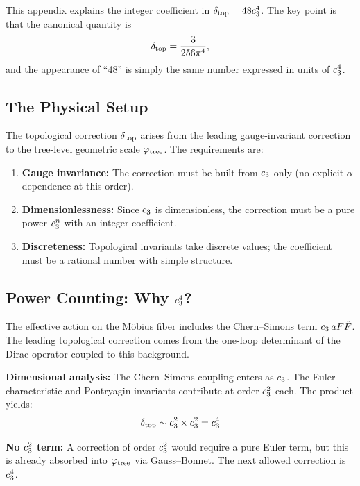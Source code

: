 This appendix explains the integer coefficient in $\delta_{\mathrm{top}} = 48c_3^4$.
The key point is that the canonical quantity is
\begin{equation}
    \delta_{\mathrm{top}} = \frac{3}{256\pi^4},
\end{equation}
and the appearance of ``48'' is simply the same number expressed in units of $c_3^4$.

\subsection{The Physical Setup}

The topological correction $\delta_{\mathrm{top}}$ arises from the leading gauge-invariant correction 
to the tree-level geometric scale $\varphi_{\mathrm{tree}}$. The requirements are:
\begin{enumerate}[leftmargin=1.5em, topsep=2pt, itemsep=1pt]
    \item \textbf{Gauge invariance:} The correction must be built from $c_3$ only 
        (no explicit $\alpha$ dependence at this order).
    \item \textbf{Dimensionlessness:} Since $c_3$ is dimensionless, the correction 
        must be a pure power $c_3^n$ with an integer coefficient.
    \item \textbf{Discreteness:} Topological invariants take discrete values; the 
        coefficient must be a rational number with simple structure.
\end{enumerate}

\subsection{\texorpdfstring{Power Counting: Why $c_3^4$?}{Power Counting: Why c3^4?}}

The effective action on the M\"obius fiber includes the Chern--Simons term 
$c_3\, a F\tilde{F}$. The leading topological correction comes from the 
one-loop determinant of the Dirac operator coupled to this background.

\textbf{Dimensional analysis:} The Chern--Simons coupling enters as $c_3$. The 
Euler characteristic and Pontryagin invariants contribute at order $c_3^2$ each. 
The product yields:
\begin{equation}
    \delta_{\mathrm{top}} \sim c_3^2 \times c_3^2 = c_3^4
\end{equation}

\textbf{No $c_3^2$ term:} A correction of order $c_3^2$ would require a 
pure Euler term, but this is already absorbed into $\varphi_{\mathrm{tree}}$ via Gauss--Bonnet. 
The next allowed correction is $c_3^4$.


